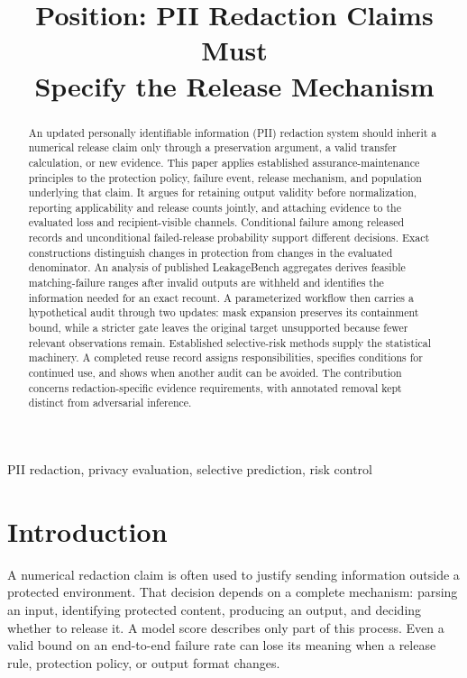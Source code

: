 \documentclass[conference]{IEEEtran}
\title{Position: PII Redaction Claims Must\protect\\Specify the Release Mechanism}
\author{\IEEEauthorblockN{Anonymous Author}}
\begin{document}
\maketitle
\begin{abstract}
An updated personally identifiable information (PII) redaction system should inherit a numerical release claim only through a preservation argument, a valid transfer calculation, or new evidence. This paper applies established assurance-maintenance principles to the protection policy, failure event, release mechanism, and population underlying that claim. It argues for retaining output validity before normalization, reporting applicability and release counts jointly, and attaching evidence to the evaluated loss and recipient-visible channels. Conditional failure among released records and unconditional failed-release probability support different decisions. Exact constructions distinguish changes in protection from changes in the evaluated denominator. An analysis of published LeakageBench aggregates derives feasible matching-failure ranges after invalid outputs are withheld and identifies the information needed for an exact recount. A parameterized workflow then carries a hypothetical audit through two updates: mask expansion preserves its containment bound, while a stricter gate leaves the original target unsupported because fewer relevant observations remain. Established selective-risk methods supply the statistical machinery. A completed reuse record assigns responsibilities, specifies conditions for continued use, and shows when another audit can be avoided. The contribution concerns redaction-specific evidence requirements, with annotated removal kept distinct from adversarial inference.
\end{abstract}
\begin{IEEEkeywords}
PII redaction, privacy evaluation, selective prediction, risk control
\end{IEEEkeywords}

\section{Introduction}
A numerical redaction claim is often used to justify sending information outside a protected environment. That decision depends on a complete mechanism: parsing an input, identifying protected content, producing an output, and deciding whether to release it. A model score describes only part of this process. Even a valid bound on an end-to-end failure rate can lose its meaning when a release rule, protection policy, or output format changes.
\end{document}
